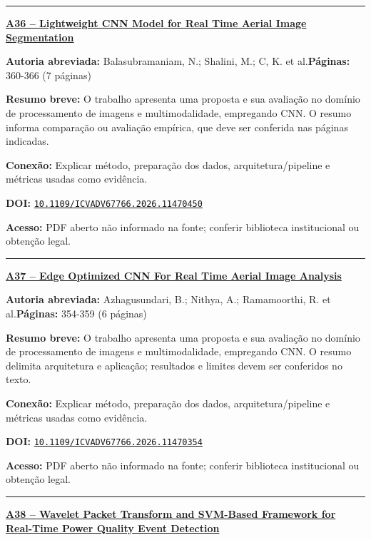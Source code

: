 \documentclass[10pt,a4paper]{article}
\begin{document}
\noindent\rule{\textwidth}{0.35pt}
\par\medskip\noindent
{\large\bfseries\href{https://doi.org/10.1109/ICVADV67766.2026.11470450}{A36 -- Lightweight CNN Model for Real Time Aerial Image Segmentation}}\par\smallskip
\textbf{Autoria abreviada:} Balasubramaniam, N.; Shalini, M.; C, K. et al.\quad \textbf{Páginas:} 360-366 (7 páginas)\par
\textbf{Resumo breve:} O trabalho apresenta uma proposta e sua avaliação no domínio de processamento de imagens e multimodalidade, empregando CNN. O resumo informa comparação ou avaliação empírica, que deve ser conferida nas páginas indicadas.\par
\textbf{Conexão:} Explicar método, preparação dos dados, arquitetura/pipeline e métricas usadas como evidência.\par
\textbf{DOI:} \href{https://doi.org/10.1109/ICVADV67766.2026.11470450}{\nolinkurl{10.1109/ICVADV67766.2026.11470450}}\par
\textbf{Acesso:} PDF aberto não informado na fonte; conferir biblioteca institucional ou obtenção legal.\par
\noindent\rule{\textwidth}{0.35pt}
\par\medskip\noindent
{\large\bfseries\href{https://doi.org/10.1109/ICVADV67766.2026.11470354}{A37 -- Edge Optimized CNN For Real Time Aerial Image Analysis}}\par\smallskip
\textbf{Autoria abreviada:} Azhagusundari, B.; Nithya, A.; Ramamoorthi, R. et al.\quad \textbf{Páginas:} 354-359 (6 páginas)\par
\textbf{Resumo breve:} O trabalho apresenta uma proposta e sua avaliação no domínio de processamento de imagens e multimodalidade, empregando CNN. O resumo delimita arquitetura e aplicação; resultados e limites devem ser conferidos no texto.\par
\textbf{Conexão:} Explicar método, preparação dos dados, arquitetura/pipeline e métricas usadas como evidência.\par
\textbf{DOI:} \href{https://doi.org/10.1109/ICVADV67766.2026.11470354}{\nolinkurl{10.1109/ICVADV67766.2026.11470354}}\par
\textbf{Acesso:} PDF aberto não informado na fonte; conferir biblioteca institucional ou obtenção legal.\par
\noindent\rule{\textwidth}{0.35pt}
\par\medskip\noindent
{\large\bfseries\href{https://doi.org/10.1109/ICVADV67766.2026.11470458}{A38 -- Wavelet Packet Transform and SVM-Based Framework for Real-Time Power Quality Event Detection}}\par\smallskip
\end{document}
